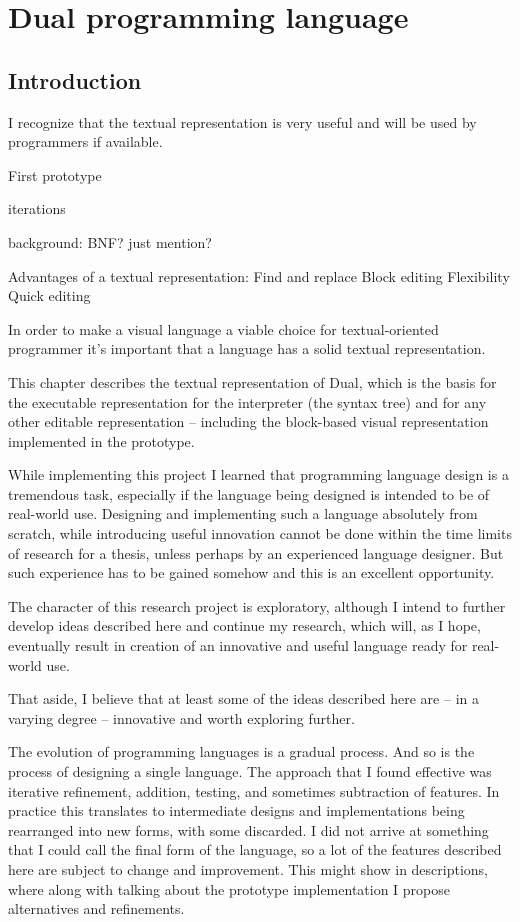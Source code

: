 \chapter{Dual programming language}\label{chap:lang}

\section{Introduction}
I recognize that the textual representation is very useful and will be used by programmers if available.


First prototype

iterations

background: BNF? just mention?

Advantages of a textual representation:
Find and replace
Block editing
Flexibility
Quick editing

In order to make a visual language a viable choice for textual-oriented programmer it's important that a language has a solid textual representation.

This chapter describes the textual representation of Dual, which is the basis for the executable representation for the interpreter (the syntax tree) and for any other editable representation -- including the block-based visual representation implemented in the prototype.

While implementing this project I learned that programming language design is a tremendous task, especially if the language being designed is intended to be of real-world use. Designing and implementing such a language absolutely from scratch, while introducing useful innovation cannot be done within the time limits of research for a thesis, unless perhaps by an experienced language designer. But such experience has to be gained somehow and this is an excellent opportunity.

The character of this research project is exploratory, although I intend to further develop ideas described here and continue my research, which will, as I hope, eventually result in creation of an innovative and useful language ready for real-world use.

That aside, I believe that at least some of the ideas described here are -- in a varying degree -- innovative and worth exploring further.

The evolution of programming languages is a gradual process. And so is the process of designing a single language. The approach that I found effective was iterative refinement, addition, testing, and sometimes subtraction of features. In practice this translates to intermediate designs and implementations being rearranged into new forms, with some discarded. I did not arrive at something that I could call the final form of the language, so a lot of the features described here are subject to change and improvement. This might show in descriptions, where along with talking about the prototype implementation I propose alternatives and refinements.

